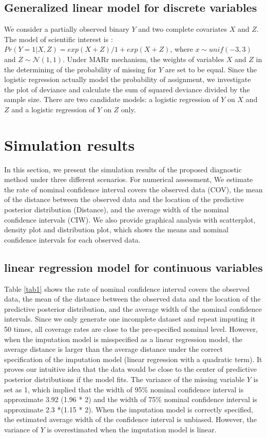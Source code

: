 \documentclass[12pt, fullpage, a4paper]{article}
\begin{document}
\subsection{Generalized linear model for discrete variables}
We consider a partially observed binary $Y$ and two complete covariates $X$ and $Z$. The model of scientific interest is : $Pr (Y = 1 | X, Z) = exp(X + Z) / 1 + exp(X + Z)$,
where $x \sim unif(-3 , 3)$ and $Z \sim \mathcal{N}(1, 1)$. Under MARr mechanism, the weights of variables $X$ and $Z$ in the determining of the probability of missing for $Y$ are set to be equal. Since the logistic regression actually model the probability of assignment, we investigate the plot of deviance and calculate the sum of squared deviance divided by the sample size. There are two candidate models: a logistic regression of $Y$ on $X$ and $Z$ and a logistic regression of $Y$ on $Z$ only.

\section{Simulation results}
In this section, we present the simulation results of the proposed diagnostic method under three different scenarios. For numerical assessment, We estimate the rate of nominal confidence interval covers the observed data (COV), the mean of the distance between the observed data and the location of the predictive posterior distribution (Distance), and the average width of the nominal confidence intervals (CIW). We also provide graphical analysis with scatterplot, density plot and distribution plot, which shows the means and nominal confidence intervals for each observed data.  

\subsection{linear regression model for continuous variables}
Table \ref{tab1} shows the rate of nominal confidence interval covers the observed data, the mean of the distance between the observed data and the location of the predictive posterior distribution, and the average width of the nominal confidence intervals. Since we only generate one incomplete dataset and repeat imputing it 50 times, all coverage rates are close to the pre-specified nominal level. However, when the imputation model is misspecified as a linear regression model, the average distance is larger than the average distance under the correct specification of the imputation model (linear regression with a quadratic term). It proves our intuitive idea that the data would be close to the center of predictive posterior distributions if the model fits. The variance of the missing variable $Y$ is set as 1, which implied that the width of 95\% nominal confidence interval is approximate 3.92 (1.96 * 2) and the width of 75\% nominal confidence interval is approximate 2.3 *(1.15 * 2). When the imputation model is correctly specified, the estimated average width of the confidence interval is unbiased. However, the variance of $Y$ is overestimated when the imputation model is linear. 
\end{document}
